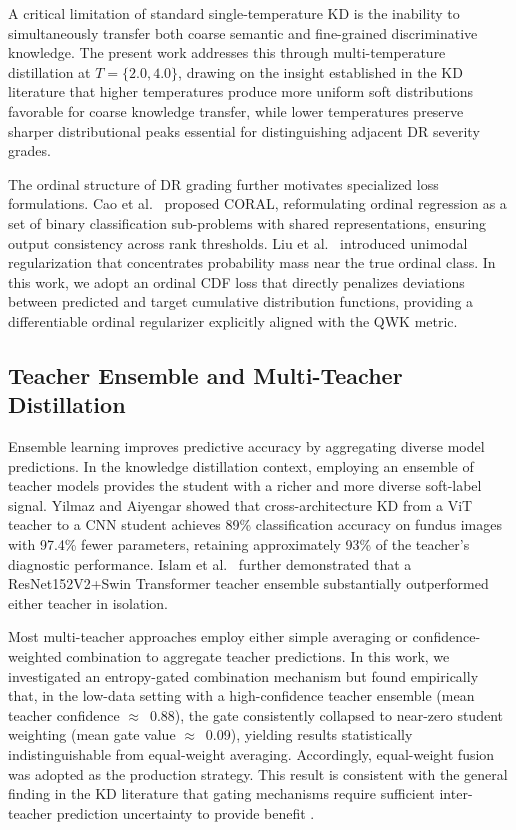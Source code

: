 \documentclass[a4paper,fleqn]{cas-dc}
\begin{document}
A critical limitation of standard single-temperature KD is the inability to simultaneously transfer both coarse semantic and fine-grained discriminative knowledge. The present work addresses this through multi-temperature distillation at $T = \{2.0, 4.0\}$, drawing on the insight established in the KD literature \cite{hinton2015,gou2021} that higher temperatures produce more uniform soft distributions favorable for coarse knowledge transfer, while lower temperatures preserve sharper distributional peaks essential for distinguishing adjacent DR severity grades.

The ordinal structure of DR grading further motivates specialized loss formulations. Cao et al.\ \cite{cao2020} proposed CORAL, reformulating ordinal regression as a set of binary classification sub-problems with shared representations, ensuring output consistency across rank thresholds. Liu et al.\ \cite{liu2020} introduced unimodal regularization that concentrates probability mass near the true ordinal class. In this work, we adopt an ordinal CDF loss that directly penalizes deviations between predicted and target cumulative distribution functions, providing a differentiable ordinal regularizer explicitly aligned with the QWK metric.

\subsection{Teacher Ensemble and Multi-Teacher Distillation}

Ensemble learning improves predictive accuracy by aggregating diverse model predictions. In the knowledge distillation context, employing an ensemble of teacher models provides the student with a richer and more diverse soft-label signal. Yilmaz and Aiyengar \cite{yilmaz2025} showed that cross-architecture KD from a ViT teacher to a CNN student achieves 89\% classification accuracy on fundus images with 97.4\% fewer parameters, retaining approximately 93\% of the teacher's diagnostic performance. Islam et al.\ \cite{islam2023} further demonstrated that a ResNet152V2+Swin Transformer teacher ensemble substantially outperformed either teacher in isolation.

Most multi-teacher approaches employ either simple averaging or confidence-weighted combination to aggregate teacher predictions. In this work, we investigated an entropy-gated combination mechanism but found empirically that, in the low-data setting with a high-confidence teacher ensemble (mean teacher confidence $\approx$~0.88), the gate consistently collapsed to near-zero student weighting (mean gate value $\approx$~0.09), yielding results statistically indistinguishable from equal-weight averaging. Accordingly, equal-weight fusion was adopted as the production strategy. This result is consistent with the general finding in the KD literature that gating mechanisms require sufficient inter-teacher prediction uncertainty to provide benefit \cite{gou2021}.
\end{document}
